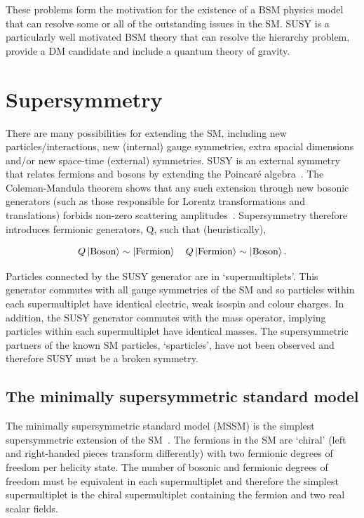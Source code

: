 These problems form the motivation for the existence of a BSM physics model that
can resolve some or all of the outstanding issues in the SM. SUSY is a particularly
well motivated BSM theory that can resolve the hierarchy problem, provide a DM candidate
and include a quantum theory of gravity.

\section{Supersymmetry}

There are many possibilities for extending the SM, 
including new particles/interactions, new (internal) gauge symmetries, 
extra spacial dimensions and/or new space-time (external) symmetries. SUSY is 
an external symmetry that relates fermions and bosons by extending the Poincar\'{e} algebra~\cite{SUSYC}. 
The Coleman-Mandula theorem shows that any such extension through new bosonic generators (such as those responsible for Lorentz 
transformations and translations) forbids non-zero scattering amplitudes~\cite{Coleman}. 
Supersymmetry therefore introduces fermionic generators, Q, such that (heuristically),

\begin{equation}
Q\ket{\text{Boson}} \sim \ket{\text{Fermion}} \quad Q\ket{\text{Fermion}} \sim \ket{\text{Boson}}.
\end{equation}

Particles connected by the SUSY generator are in `supermultiplets'. This generator commutes with all gauge symmetries 
of the SM and so particles within each supermultiplet have identical electric, weak isospin and colour charges.
In addition, the SUSY generator commutes with the mass operator, implying 
particles within each supermultiplet have identical masses. The supersymmetric partners of the 
known SM particles, `sparticles', have not been observed and therefore SUSY must be a broken symmetry.

\subsection{The minimally supersymmetric standard model}

The minimally supersymmetric standard model (MSSM) is the simplest supersymmetric extension of the SM~\cite{SUSYP}.
The fermions in the SM are `chiral' (left and right-handed pieces transform differently)
with two fermionic degrees of freedom per helicity state. The number of bosonic and fermionic degrees 
of freedom must be equivalent in each supermultiplet and therefore the simplest supermultiplet
is the chiral supermultiplet containing the fermion and two real scalar fields.

